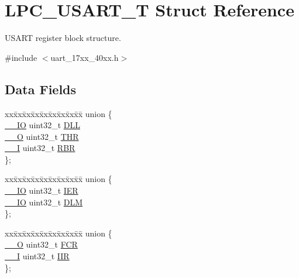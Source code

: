 \hypertarget{structLPC__USART__T}{\section{L\-P\-C\-\_\-\-U\-S\-A\-R\-T\-\_\-\-T Struct Reference}
\label{structLPC__USART__T}
}


U\-S\-A\-R\-T register block structure.  




{\ttfamily \#include $<$uart\-\_\-17xx\-\_\-40xx.\-h$>$}

\subsection*{Data Fields}
\begin{DoxyCompactItemize}
\item 
\begin{tabbing}
xx\=xx\=xx\=xx\=xx\=xx\=xx\=xx\=xx\=\kill
union \{\\
\>\hyperlink{core__cm3_8h_aec43007d9998a0a0e01faede4133d6be}{\_\_IO} uint32\_t \hyperlink{structLPC__USART__T_ac2e91646e820b1527747154d82778e48}{DLL}\\
\>\hyperlink{core__cm3_8h_a7e25d9380f9ef903923964322e71f2f6}{\_\_O} uint32\_t \hyperlink{structLPC__USART__T_ae93392fb8e6c40f5b340ec0cf145ee1b}{THR}\\
\>\hyperlink{core__cm3_8h_af63697ed9952cc71e1225efe205f6cd3}{\_\_I} uint32\_t \hyperlink{structLPC__USART__T_a39191d418ae7de55f62202f25fd29083}{RBR}\\
\}; \\

\end{tabbing}\item 
\begin{tabbing}
xx\=xx\=xx\=xx\=xx\=xx\=xx\=xx\=xx\=\kill
union \{\\
\>\hyperlink{core__cm3_8h_aec43007d9998a0a0e01faede4133d6be}{\_\_IO} uint32\_t \hyperlink{structLPC__USART__T_a832413236bebfb6e6495c1055b9a85ae}{IER}\\
\>\hyperlink{core__cm3_8h_aec43007d9998a0a0e01faede4133d6be}{\_\_IO} uint32\_t \hyperlink{structLPC__USART__T_a3e9b4b467fbbf43e57e261fd826e5e97}{DLM}\\
\}; \\

\end{tabbing}\item 
\begin{tabbing}
xx\=xx\=xx\=xx\=xx\=xx\=xx\=xx\=xx\=\kill
union \{\\
\>\hyperlink{core__cm3_8h_a7e25d9380f9ef903923964322e71f2f6}{\_\_O} uint32\_t \hyperlink{structLPC__USART__T_a01d439a681b9a7a486ad75c91a2f91c8}{FCR}\\
\>\hyperlink{core__cm3_8h_af63697ed9952cc71e1225efe205f6cd3}{\_\_I} uint32\_t \hyperlink{structLPC__USART__T_a470cdb18abc446a9768f404314c4a556}{IIR}\\
\}; \\


\end{tabbing}
\end{DoxyCompactItemize}
